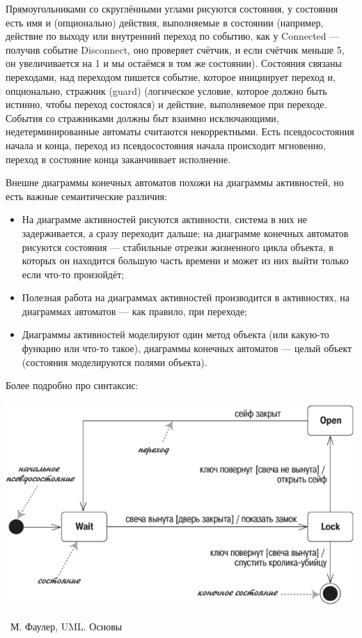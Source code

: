 \documentclass[a5paper]{article}
\newcommand{\attribution}[1] {
	\vspace{-5mm}\begin{flushright}\begin{scriptsize}%
	{\textcopyright\, #1}\end{scriptsize}\end{flushright}
}
\begin{document}
Прямоугольниками со скруглёнными углами рисуются состояния, у состояния есть имя и (опционально) действия, выполняемые в состоянии (например, действие по выходу или внутренний переход по событию, как у Connected --- получив событие Disconnect, оно проверяет счётчик, и если счётчик меньше 5, он увеличивается на 1 и мы остаёмся в том же состоянии). Состояния связаны переходами, над переходом пишется событие, которое инициирует переход и, опционально, стражник (guard) (логическое условие, которое должно быть истинно, чтобы переход состоялся) и действие, выполняемое при переходе. События со стражниками должны быт взаимно исключающими, недетерминированные автоматы считаются некорректными. Есть псевдосостояния начала и конца, переход из псевдосостояния начала происходит мгновенно, переход в состояние конца заканчиввает исполнение.

Внешне диаграммы конечных автоматов похожи на диаграммы активностей, но есть важные семантические различия:

\begin{itemize}
	\item На диаграмме активностей рисуются активности, система в них не задерживается, а сразу переходит дальше; на диаграмме конечных автоматов рисуются состояния --- стабильные отрезки жизненного цикла объекта, в которых он находится большую часть времени и может из них выйти только если что-то произойдёт;
	\item Полезная работа на диаграммах активностей производится в активностях, на диаграммах автоматов --- как правило, при переходе;
	\item Диаграммы активностей моделируют один метод объекта (или какую-то функцию или что-то такое), диаграммы конечных автоматов --- целый объект (состояния моделируются полями объекта).
\end{itemize}

Более подробно про синтаксис:

\begin{center}
	\includegraphics[width=\textwidth]{stateTransitionSyntax.png}
	\attribution{М. Фаулер, UML. Основы}
\end{center}
\end{document}
